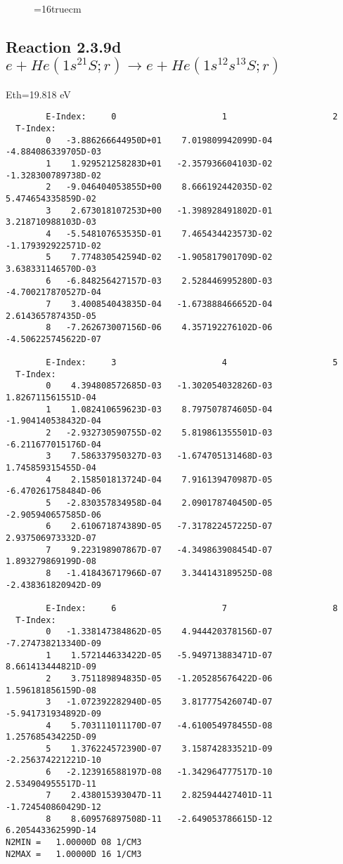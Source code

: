 \documentclass[12pt,dvipdfmx]{article}
\begin{document}
{\begin{small}
\begin{verbatim}
\end{verbatim}\end{small}
\begin{figure} \label{2.3.9c}
\epsfxsize=16truecm
\end{figure}
\newpage

\subsection{
Reaction 2.3.9d $ e + He(1s^21S;r) \rightarrow e + He(1s^12s^13S;r) $
}
Eth=19.818 eV



\begin{small}\begin{verbatim}
        E-Index:     0                     1                     2
  T-Index:
        0   -3.886266644950D+01    7.019809942099D-04   -4.884086339705D-03
        1    1.929521258283D+01   -2.357936604103D-02   -1.328300789738D-02
        2   -9.046404053855D+00    8.666192442035D-02    5.474654335859D-02
        3    2.673018107253D+00   -1.398928491802D-01    3.218710988103D-03
        4   -5.548107653535D-01    7.465434423573D-02   -1.179392922571D-02
        5    7.774830542594D-02   -1.905817901709D-02    3.638331146570D-03
        6   -6.848256427157D-03    2.528446995280D-03   -4.700217870527D-04
        7    3.400854043835D-04   -1.673888466652D-04    2.614365787435D-05
        8   -7.262673007156D-06    4.357192276102D-06   -4.506225745622D-07

        E-Index:     3                     4                     5
  T-Index:
        0    4.394808572685D-03   -1.302054032826D-03    1.826711561551D-04
        1    1.082410659623D-03    8.797507874605D-04   -1.904140538432D-04
        2   -2.932730590755D-02    5.819861355501D-03   -6.211677015176D-04
        3    7.586337950327D-03   -1.674705131468D-03    1.745859315455D-04
        4    2.158501813724D-04    7.916139470987D-05   -6.470261758484D-06
        5   -2.830357834958D-04    2.090178740450D-05   -2.905940657585D-06
        6    2.610671874389D-05   -7.317822457225D-07    2.937506973332D-07
        7    9.223198907867D-07   -4.349863908454D-07    1.893279869199D-08
        8   -1.418436717966D-07    3.344143189525D-08   -2.438361820942D-09

        E-Index:     6                     7                     8
  T-Index:
        0   -1.338147384862D-05    4.944420378156D-07   -7.274738213340D-09
        1    1.572144633422D-05   -5.949713883471D-07    8.661413444821D-09
        2    3.751189894835D-05   -1.205285676422D-06    1.596181856159D-08
        3   -1.072392282940D-05    3.817775426074D-07   -5.941731934892D-09
        4    5.703111011170D-07   -4.610054978455D-08    1.257685434225D-09
        5    1.376224572390D-07    3.158742833521D-09   -2.256374221221D-10
        6   -2.123916588197D-08   -1.342964777517D-10    2.534904955517D-11
        7    2.438015393047D-11    2.825944427401D-11   -1.724540860429D-12
        8    8.609576897508D-11   -2.649053786615D-12    6.205443362599D-14
N2MIN =   1.00000D 08 1/CM3
N2MAX =   1.00000D 16 1/CM3


\end{verbatim}
\end{small}}
\end{document}
